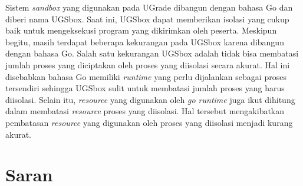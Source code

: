 \par Sistem \textit{sandbox} yang digunakan pada UGrade dibangun dengan bahasa Go dan diberi nama UGSbox. Saat ini, UGSbox dapat memberikan isolasi yang cukup baik untuk mengeksekusi program yang dikirimkan oleh peserta. Meskipun begitu, masih terdapat beberapa kekurangan pada UGSbox karena dibangun dengan bahasa Go. Salah satu kekurangan UGSbox adalah tidak bisa membatasi jumlah proses yang diciptakan oleh proses yang diisolasi secara akurat. Hal ini disebabkan bahasa Go memiliki \textit{runtime} yang perlu dijalankan sebagai proses tersendiri sehingga UGSbox sulit untuk membatasi jumlah proses yang harus diisolasi. Selain itu, \textit{resource} yang digunakan oleh \textit{go runtime} juga ikut dihitung dalam membatasi \textit{resource} proses yang diisolasi. Hal tersebut mengakibatkan pembatasan \textit{resource} yang digunakan oleh proses yang diisolasi menjadi kurang akurat.

\section{Saran}

